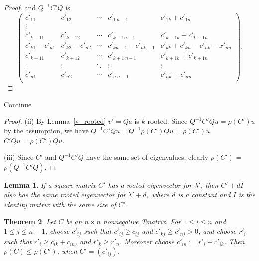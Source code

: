 \documentclass{article}
\theoremstyle{plain}
\newtheorem{thm}{Theorem}[chapter]
\newtheorem{lem}[thm]{Lemma}
\theoremstyle{definition}
\begin{document}
    \begin{proof}
        and $Q^{-1}C'Q$ is
        $$\begin{pmatrix}
        c'_{11}     & c'_{12} & \cdots     & c'_{1\ n-1} & c'_{1k}+c'_{1n} \\
        \vdots \\
        c'_{k-11}     & c'_{k-1 2}           & \cdots     & c'_{k-1 n-1} & c'_{k-1k}+c'_{k-1n} \\
        c'_{k1}-c'_{n1} & c'_{k2}-c'_{n2} &\cdots      &c'_{kn-1}-c'_{nk-1}& c'_{kk}+c'_{kn}-c'_{nk}-x'_{nn}\\
        c'_{k+11}     & c'_{k+12}           & \cdots     & c'_{k+1\ n-1} & c'_{k+1k}+c'_{k+1n} \\
        \vdots              & \vdots & \ddots              & \vdots & \vdots \\
        c'_{n1}             & c'_{n2} & \cdots             & c'_{n\ n-1} & c'_{nk}+c'_{nn} \\
        \end{pmatrix}.$$
    \end{proof}



    {{Continue}}
    \begin{proof}
        (ii)
            By Lemma~\ref{v_rooted} $v'=Qu$ is $k$-rooted.  
            Since $Q^{-1}C'Qu=\rho(C')u$ by the assumption, we have
            $Q^{-1} C' Q u  = Q^{-1} \rho(C') Qu  =\rho(C')u$  \\
            $C'Qu=\rho(C')Qu$.

        (iii)
        Since $C'$ and $Q^{-1}C'Q$ have the same set of eigenvalues, clearly $\rho(C')$ = $\rho(Q^{-1}C'Q)$.

    \end{proof}


\begin{lem}\label{l_diag}   %
If a square matrix $C'$ has a rooted eigenvector for $\lambda'$, then $C'+dI$ also has
the same rooted eigenvector for $\lambda'+d,$ where $d$ is a constant and $I$ is the identity matrix with the same size of $C'$.
\end{lem}

\begin{thm}
    Let $C$ be an $n\times n$ nonnegative Tmatrix. For $1\leq i \leq n$ and $1\leq j\leq n-1$, choose $c'_{ij}$
    such that $c'_{ij}\geq c_{ij}$ and $c'_{kj}\geq c'_{nj}>0$, and choose $r'_i$ such that $r'_i\geq c_{ik}+c_{in}$, and
    $r'_k \geq r'_n$. Moreover choose $c'_{in}:=r'_i-c'_{ik}$. Then $\rho(C)\leq \rho(C')$, when $C'=(c'_{ij})$.
\end{thm}
\end{document}
